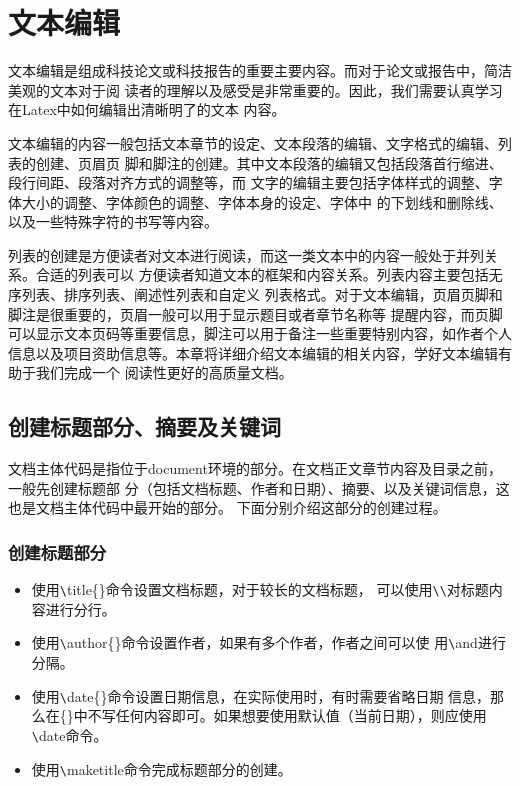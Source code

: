 \chapter{文本编辑}
文本编辑是组成科技论文或科技报告的重要主要内容。而对于论文或报告中，简洁美观的文本对于阅
读者的理解以及感受是非常重要的。因此，我们需要认真学习在Latex中如何编辑出清晰明了的文本
内容。

文本编辑的内容一般包括文本章节的设定、文本段落的编辑、文字格式的编辑、列表的创建、页眉页
脚和脚注的创建。其中文本段落的编辑又包括段落首行缩进、段行间距、段落对齐方式的调整等，而
文字的编辑主要包括字体样式的调整、字体大小的调整、字体颜色的调整、字体本身的设定、字体中
的下划线和删除线、以及一些特殊字符的书写等内容。

列表的创建是方便读者对文本进行阅读，而这一类文本中的内容一般处于并列关系。合适的列表可以
方便读者知道文本的框架和内容关系。列表内容主要包括无序列表、排序列表、阐述性列表和自定义
列表格式。对于文本编辑，页眉页脚和脚注是很重要的，页眉一般可以用于显示题目或者章节名称等
提醒内容，而页脚可以显示文本页码等重要信息，脚注可以用于备注一些重要特别内容，如作者个人
信息以及项目资助信息等。本章将详细介绍文本编辑的相关内容，学好文本编辑有助于我们完成一个
阅读性更好的高质量文档。

\section{创建标题部分、摘要及关键词}
文档主体代码是指位于document环境的部分。在文档正文章节内容及目录之前，一般先创建标题部
分（包括文档标题、作者和日期）、摘要、以及关键词信息，这也是文档主体代码中最开始的部分。
下面分别介绍这部分的创建过程。

\subsection{创建标题部分}
\begin{itemize}
    \item 使用\verb|\|title\{\}命令设置文档标题，对于较长的文档标题，
          可以使用\verb|\\|对标题内容进行分行。
    \item 使用\verb|\|author\{\}命令设置作者，如果有多个作者，作者之间可以使
          用\verb|\|and进行分隔。
    \item 使用\verb|\|date\{\}命令设置日期信息，在实际使用时，有时需要省略日期
          信息，那么在\{\}中不写任何内容即可。如果想要使用默认值（当前日期），则应使用\verb|\|date命令。
    \item 使用\verb|\|maketitle命令完成标题部分的创建。
\end{itemize}


